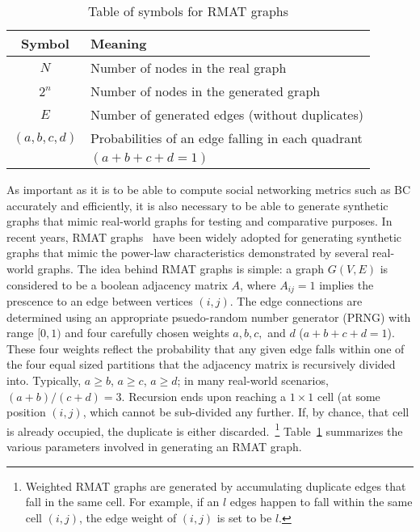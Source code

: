 \begin{table}
\begin{center}
\begin{tabular}{|c|l|}  \hline
Symbol & Meaning \\ \hline
$N$ & Number of nodes in the real graph \\ \hline
$2^n$ & Number of nodes in the generated graph \\ \hline
$E$ & Number of generated edges (without duplicates) \\ \hline
$(a,b,c,d)$ & Probabilities of an edge falling in each quadrant \\ 
 & $(a+b+c+d=1)$ \\ \hline
\end{tabular}
\caption{Table of symbols for RMAT graphs}
\label{tbl:rmat}
\end{center}
\end{table}
%
As important as it is to be able to compute social networking metrics such as
BC accurately and efficiently, it is also necessary to be able to generate
synthetic graphs that mimic real-world graphs for testing and comparative
purposes.
%
In recent years, RMAT graphs~\cite{Chakrabarti04:Recursive} have been widely
adopted for generating synthetic graphs that mimic the power-law
characteristics demonstrated by several real-world graphs.
%
The idea behind RMAT graphs is simple: a graph $G(V,E)$ is considered to be 
a boolean adjacency matrix $A$, where $A_{ij}=1$ implies the prescence to an 
edge between vertices $(i,j)$.
%
The edge connections are determined using an appropriate psuedo-random number 
generator (PRNG) with range $[0,1)$ and four carefully chosen weights $a,b,c,$
and $d$ ($a+b+c+d=1$).
%
These four weights reflect the probability that any given edge falls within one
of the four equal sized partitions that the adjacency matrix is recursively
divided into.
%
Typically, $a\ge{}b$, $a\ge{}c$, $a\ge{}d$; in many real-world scenarios,
$(a+b)/(c+d)=3$.
%
Recursion ends upon reaching a $1\times{}1$ cell (at some position $(i,j)$,
which cannot be sub-divided any further.
%
If, by chance, that cell is already occupied, the duplicate is either
discarded.~\footnote{Weighted RMAT graphs are generated by accumulating
duplicate edges that fall in the same cell. For example, if an $l$ edges happen
to fall within the same cell $(i,j)$, the edge weight of $(i,j)$ is set to be
$l$.}
%
Table~\ref{tbl:rmat} summarizes the various parameters involved in generating 
an RMAT graph.
